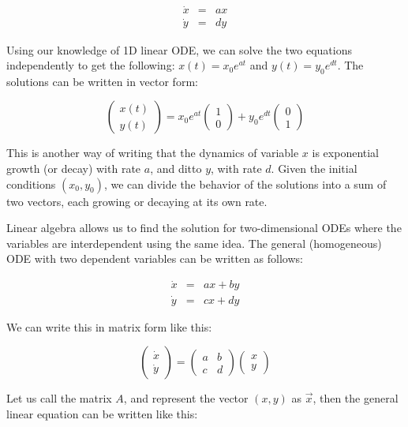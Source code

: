 \documentclass[
  letterpaper,
  DIV=11,
  numbers=noendperiod]{scrreprt}
\begin{document}
\[
\begin{aligned}
\dot x & = & ax \\
\dot y & = & dy
\end{aligned}
\]

Using our knowledge of 1D linear ODE, we can solve the two equations
independently to get the following: \(x(t) = x_0 e^{at}\) and
\(y(t) = y_0 e^{dt}\). The solutions can be written in vector form:

\[
\left(\begin{array}{c}x(t) \\y(t)\end{array}\right) =
x_0 e^{at} \left(\begin{array}{c}1 \\0\end{array}\right)+y_0 e^{dt}\left(\begin{array}{c}0\\1\end{array}\right)
\]

This is another way of writing that the dynamics of variable \(x\) is
exponential growth (or decay) with rate \(a\), and ditto \(y\), with
rate \(d\). Given the initial conditions \((x_0, y_0)\), we can divide
the behavior of the solutions into a sum of two vectors, each growing or
decaying at its own rate.

Linear algebra allows us to find the solution for two-dimensional ODEs
where the variables are interdependent using the same idea. The general
(homogeneous) ODE with two dependent variables can be written as
follows:

\[
\begin{aligned}
\dot x & = & ax + by \\
\dot y & = & cx + dy
\end{aligned}
\]

We can write this in matrix form like this:

\[
\left(\begin{array}{c}\dot x \\ \dot y \end{array}\right) = \left(\begin{array}{cc}a & b \\c & d\end{array}\right)\left(\begin{array}{c}x \\ y \end{array}\right)
\]

Let us call the matrix \(A\), and represent the vector \((x,y)\) as
\(\vec {x}\), then the general linear equation can be written like this:
\end{document}
